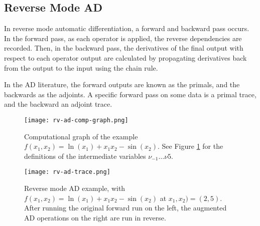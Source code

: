 \subsection{Reverse Mode AD}
In reverse mode automatic differentiation, a forward and backward pass occurs.
In the forward pass, as each operator is applied, the reverse dependencies are recorded.
Then, in the backward pass, the derivatives of the final output with respect to each operator output are calculated by propagating derivatives back from the output to the input using the chain rule.

In the AD literature, the forward outputs are known as the primals, and the backwards as the adjoints.
A specific forward pass on some data is a primal trace, and the backward an adjoint trace.

\begin{figure}[tb]
    \centering
    \texttt{[image: rv-ad-comp-graph.png]}
    \caption{Computational graph of the example \(f(x_1, x_2) = \ln(x_1) + x_1x_2 - \sin(x_2)\). See Figure \ref{fig:2-rv-ad-comp-graph} for the definitions of the intermediate variables \(\nu_{-1}\ldots\nu{5}\). \cite[Figure~3]{Baydin2015}}
    \label{fig:2-rv-ad-comp-graph}
\end{figure}
\begin{figure}[tb]
    \centering
    \texttt{[image: rv-ad-trace.png]}
    \caption{Reverse mode AD example, with \(f(x_1, x_2) = \ln(x_1) + x_1x_2 - \sin(x_2)\) at \(x_1, x_2) = (2, 5)\). After running the original forward run on the left, the augmented AD operations on the right are run in reverse. \cite[Table~3]{Baydin2015}}
    \label{fig:2-rv-ad-trace}
\end{figure}

